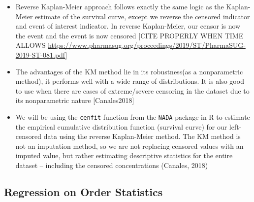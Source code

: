 \documentclass[12pt, twoside]{amherstthesis}
\begin{document}
\begin{itemize}
\item
  Reverse Kaplan-Meier approach follows exactly the same logic as the Kaplan-Meier estimate of the survival curve, except we reverse the censored indicator and event of interest indicator. In reverse Kaplan-Meier, our censor is now the event and the event is now censored {[}CITE PROPERLY WHEN TIME ALLOWS \url{https://www.pharmasug.org/proceedings/2019/ST/PharmaSUG-2019-ST-081.pdf}{]}
\item
  The advantages of the KM method lie in its robustness(as a nonparametric method), it performs well with a wide range of distributions. It is also good to use when there are cases of extreme/severe censoring in the dataset due to its nonparametric nature {[}Canales2018{]}
\item
  We will be using the \texttt{cenfit} function from the \texttt{NADA} package in R to estimate the empirical cumulative distribution function (survival curve) for our left-censored data using the reverse Kaplan-Meier method. The KM method is not an imputation method, so we are not replacing censored values with an imputed value, but rather estimating descriptive statistics for the entire dataset -- including the censored concentrations (Canales, 2018)
\end{itemize}
\hypertarget{ROS}{%
\subsection{Regression on Order Statistics}\label{ROS}}
\end{document}
